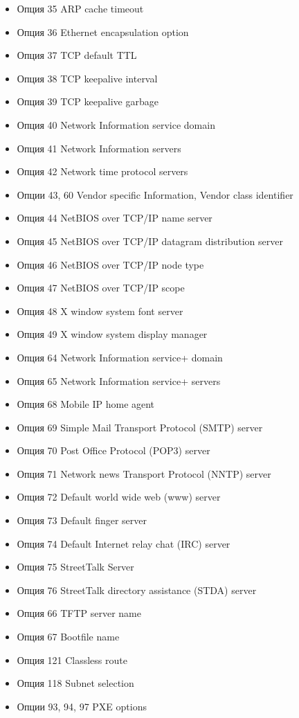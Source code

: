 \documentclass[14pt,a4paper]{extarticle}
\begin{document}
\begin{itemize}
    \item Опция 35 ARP cache timeout
    \item Опция 36 Ethernet encapsulation option
    \item Опция 37 TCP default TTL
    \item Опция 38 TCP keepalive interval
    \item Опция 39 TCP keepalive garbage
    \item Опция 40 Network Information service domain
    \item Опция 41 Network Information servers
    \item Опция 42 Network time protocol servers
    \item Опции 43, 60 Vendor specific Information, Vendor class identifier
    \item Опция 44 NetBIOS over TCP/IP name server
    \item Опция 45 NetBIOS over TCP/IP datagram distribution server
    \item Опция 46 NetBIOS over TCP/IP node type
    \item Опция 47 NetBIOS over TCP/IP scope
    \item Опция 48 X window system font server
    \item Опция 49 X window system display manager
    \item Опция 64 Network Information service+ domain
    \item Опция 65 Network Information service+ servers
    \item Опция 68 Mobile IP home agent
    \item Опция 69 Simple Mail Transport Protocol (SMTP) server
    \item Опция 70 Post Office Protocol (POP3) server
    \item Опция 71 Network news Transport Protocol (NNTP) server
    \item Опция 72 Default world wide web (www) server
    \item Опция 73 Default finger server
    \item Опция 74 Default Internet relay chat (IRC) server
    \item Опция 75 StreetTalk Server
    \item Опция 76 StreetTalk directory assistance (STDA) server
    \item Опция 66 TFTP server name
    \item Опция 67 Bootfile name
    \item Опция 121 Classless route
    \item Опция 118 Subnet selection
    \item Опции 93, 94, 97 PXE options
\end{itemize}
\end{document}
